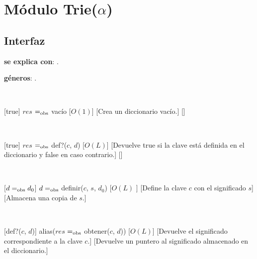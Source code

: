 \section{Módulo Trie($\alpha$)}

\subsection{Interfaz}

  \textbf{se explica con}: .

  \textbf{géneros}: .

  ~

  [true]
  {$res$ $=_{\mathrm{obs}}$ vacío}
  [$O(1)$]
  [Crea un diccionario vacío.]
  []

  ~

  [true]
	{$res$ $=_{\mathrm{obs}}$ def?($c$, $d$)}
	[$O(L)$]
	[Devuelve true si la clave está definida en el diccionario y false en caso contrario.]
	[]

  ~

  [$ d =_{\mathrm{obs}} d_0 $]
  {$ d =_{\mathrm{obs}}$ definir($c$, $s$, $d_0$)}
  [$O(L)$ ]
  [Define la clave $c$ con el significado $s$]
  [Almacena una copia de $s$.]

  ~

	[def?($c$, $d$)]
	{alias($res$ $=_{\mathrm{obs}}$ obtener($c$, $d$))}
	[$O(L)$]
	[Devuelve el significado correspondiente a la clave $c$.]
	[Devuelve un puntero al significado almacenado en el diccionario.]
